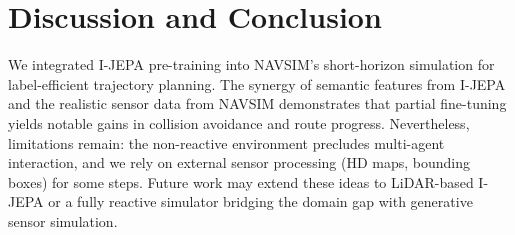 \documentclass{article}
\begin{document}
\section{Discussion and Conclusion}
We integrated I-JEPA pre-training into NAVSIM’s short-horizon simulation for label-efficient trajectory planning. The synergy of semantic features from I-JEPA and the realistic sensor data from NAVSIM demonstrates that partial fine-tuning yields notable gains in collision avoidance and route progress. Nevertheless, limitations remain: the non-reactive environment precludes multi-agent interaction, and we rely on external sensor processing (HD maps, bounding boxes) for some steps. Future work may extend these ideas to LiDAR-based I-JEPA \cite{adljepa2025} or a fully reactive simulator bridging the domain gap with generative sensor simulation.

\end{document}
